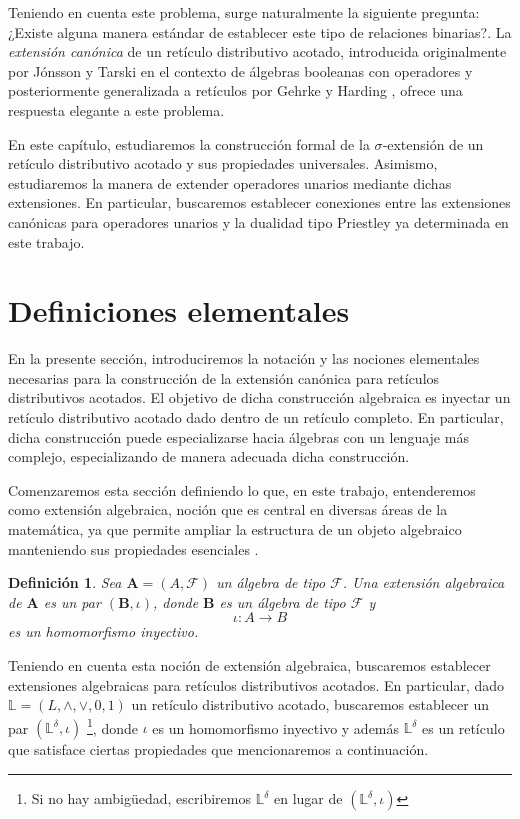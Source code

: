 \documentclass[12pt]{book}
\newtheorem{definition}[theorem]{Definición}
\begin{document}
Teniendo en cuenta este problema, surge naturalmente la siguiente pregunta: ¿Existe alguna manera estándar de establecer este tipo de relaciones binarias?. La \emph{extensión canónica} de un retículo distributivo acotado, introducida originalmente por Jónsson y Tarski en el contexto de álgebras booleanas con operadores y posteriormente generalizada a retículos por Gehrke y Harding \cite{GehrkeHarding2001}, ofrece una respuesta elegante a este problema. 
\medskip

En este capítulo, estudiaremos la construcción formal de la $\sigma$‑extensión de un retículo distributivo acotado y sus propiedades universales. Asimismo, estudiaremos la manera de extender operadores unarios mediante dichas extensiones. En particular, buscaremos establecer conexiones entre las extensiones canónicas para operadores unarios y la dualidad tipo Priestley ya determinada en este trabajo. 




\section{Definiciones elementales} \label{S 4.1}

En la presente sección, introduciremos la notación y las nociones elementales necesarias para la construcción de la extensión canónica para retículos distributivos acotados. El objetivo de dicha construcción algebraica es inyectar un retículo distributivo acotado dado dentro de un retículo completo. En particular, dicha construcción puede especializarse hacia álgebras con un lenguaje más complejo, especializando de manera adecuada dicha construcción.  



Comenzaremos esta sección definiendo lo que, en este trabajo, entenderemos como extensión algebraica, noción que es central en diversas áreas de la matemática, ya que permite ampliar la estructura de un objeto algebraico manteniendo sus propiedades esenciales .\\


\begin{definition} Sea $\mathbf{A} = (A,\mathcal{F})$ un álgebra de tipo $\mathcal{F}$. Una \emph{extensión algebraica} de $\mathbf{A}$ es un par $(\mathbf{B}, \iota)$, donde $\mathbf{B}$ es un álgebra de tipo $\mathcal{F}$  y
$$
\iota: A \to B
$$
es un homomorfismo inyectivo. 
\end{definition}

Teniendo en cuenta esta noción de extensión algebraica, buscaremos establecer extensiones algebraicas para retículos distributivos acotados. En particular, dado $\mathbb{L} = (L,\wedge,\vee,0,1)$ un retículo distributivo acotado, buscaremos establecer un par $\left( \mathbb{L}^{\delta},\iota \right)$ \footnote{Si no hay ambigüedad, escribiremos $\mathbb{L}^{\delta}$ en lugar de $\left( \mathbb{L}^{\delta},\iota \right)$}, donde $\iota$ es un homomorfismo inyectivo y además $\mathbb{L}^{\delta}$ es un retículo que satisface ciertas propiedades que mencionaremos a continuación.\\
\end{document}
